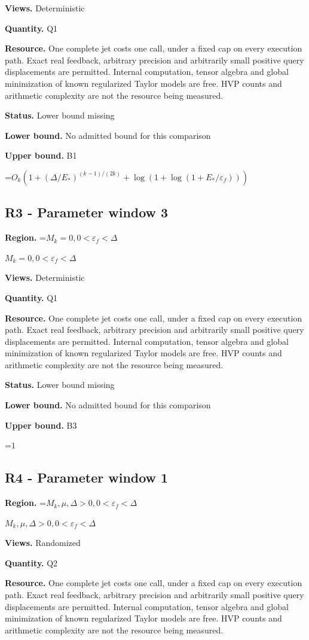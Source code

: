 \documentclass[10pt,a4paper]{article}
\newcommand{\AtlasMath}[1]{\par\begingroup\centering\setbox0=\hbox{$\displaystyle #1$}\ifdim\wd0>1.4\linewidth\typeout{ATLAS WIDE FORMULA: \the\wd0}\fi\ifdim\wd0>\linewidth\resizebox{\linewidth}{!}{\box0}\else\box0\fi\par\endgroup}
\newcommand{\AtlasInlineMath}[1]{\begingroup\setbox0=\hbox{$#1$}\ifdim\wd0>.4\linewidth\endgroup\AtlasMath{#1}\else\endgroup$#1$\fi}
\begin{document}
\textbf{Views.} Deterministic

\textbf{Quantity.} Q1

\textbf{Resource.} One complete jet costs one call, under a fixed cap on every execution path. Exact real feedback, arbitrary precision and arbitrarily small positive query displacements are permitted. Internal computation, tensor algebra and global minimization of known regularized Taylor models are free. HVP counts and arithmetic complexity are not the resource being measured.

\textbf{Status.} Lower bound missing

\textbf{Lower bound.} No admitted bound for this comparison

\textbf{Upper bound.} B1

\AtlasMath{O_k(1+(\Delta/E_*)^{(k-1)/(2k)}+\log(1+\log(1+E_*/\varepsilon_f)))}
\subsection{R3 - Parameter window 3}
\textbf{Region.} \AtlasInlineMath{M_k=0,0<\varepsilon_f<\Delta}

\textbf{Views.} Deterministic

\textbf{Quantity.} Q1

\textbf{Resource.} One complete jet costs one call, under a fixed cap on every execution path. Exact real feedback, arbitrary precision and arbitrarily small positive query displacements are permitted. Internal computation, tensor algebra and global minimization of known regularized Taylor models are free. HVP counts and arithmetic complexity are not the resource being measured.

\textbf{Status.} Lower bound missing

\textbf{Lower bound.} No admitted bound for this comparison

\textbf{Upper bound.} B3

\AtlasMath{1}
\subsection{R4 - Parameter window 1}
\textbf{Region.} \AtlasInlineMath{M_k,\mu,\Delta>0,0<\varepsilon_f<\Delta}

\textbf{Views.} Randomized

\textbf{Quantity.} Q2

\textbf{Resource.} One complete jet costs one call, under a fixed cap on every execution path. Exact real feedback, arbitrary precision and arbitrarily small positive query displacements are permitted. Internal computation, tensor algebra and global minimization of known regularized Taylor models are free. HVP counts and arithmetic complexity are not the resource being measured.
\end{document}
